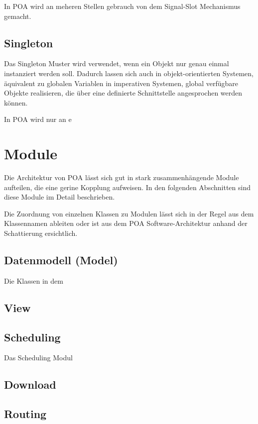 In POA wird an meheren Stellen gebrauch von dem Signal-Slot
Mechanismus gemacht.

\subsection{Singleton}

Das Singleton Muster wird verwendet, wenn ein Objekt nur genau einmal
instanziert werden soll. Dadurch lassen sich auch in
objekt-orientierten Systemen, äquivalent zu globalen Variablen in
imperativen Systemen, global verfügbare Objekte realisieren,
die über eine definierte Schnittstelle angesprochen werden können. 

In POA wird nur an e


\section{Module}

Die Architektur von POA lässt sich gut in stark zusammenhängende
Module aufteilen, die eine gerine Kopplung aufweisen. In den folgenden
Abschnitten sind diese Module im Detail beschrieben.

Die Zuordnung von einzelnen Klassen zu Modulen lässt sich in der Regel
aus dem Klassennamen ableiten oder ist aus dem POA
Software-Architektur anhand der Schattierung ersichtlich.

\subsection{Datenmodell (Model)}

Die Klassen in dem 

\subsection{View}

\subsection{Scheduling}

Das Scheduling Modul 

\subsection{Download}

\subsection{Routing}

